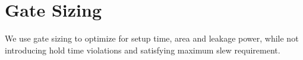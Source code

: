 %

\section{Gate Sizing}
\label{sec:gate_sizing}

We use gate sizing to optimize for setup time, area and leakage power, while not introducing hold time violations and satisfying maximum slew requirement.

